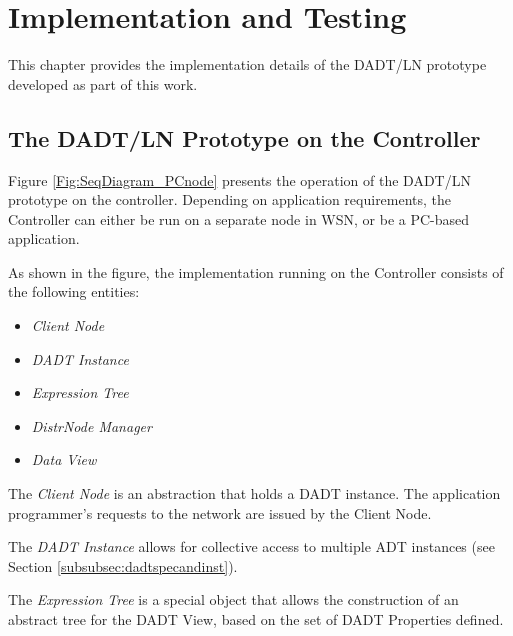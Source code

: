 \chapter{Implementation and Testing}\label{chap:implementation}

This chapter provides the implementation details of the DADT/LN prototype
developed as part of this work.  


\section{The DADT/LN Prototype on the Controller}

Figure \ref{Fig:SeqDiagram_PCnode} presents the operation of the DADT/LN
prototype on the controller. 
Depending on application requirements, the Controller can either be run on a separate
node in WSN, or be a PC-based application.

As shown in the figure, the implementation running on the Controller consists of
the following entities:

\begin{itemize}
  \item \emph{Client Node}
  \item \emph{DADT Instance}
  \item \emph{Expression Tree} 
  \item \emph{DistrNode Manager} 
  \item \emph{Data View} 
\end{itemize}

The \emph{Client Node} is an abstraction that holds a DADT
instance. The application programmer's requests to the network are issued
by the Client Node.
  
The \emph{DADT Instance} allows for collective access to multiple ADT instances (see Section \ref{subsubsec:dadtspecandinst}).

The \emph{Expression Tree} is a special object that allows the construction of an abstract
tree for the DADT View, based on the set of DADT Properties defined.

